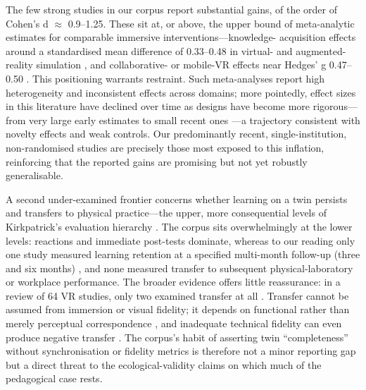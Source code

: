 The few strong studies in our corpus report substantial gains, of the order of
Cohen's d \ensuremath{\approx} 0.9--1.25. These sit at, or above, the upper bound of
meta-analytic estimates for comparable immersive interventions---knowledge-
acquisition effects around a standardised mean difference of 0.33--0.48 in
virtual- and augmented-reality simulation \cite{li_effects_2026,almekkawi_effectiveness_2026}, and collaborative- or mobile-VR effects near Hedges'
g 0.47--0.50 \cite{chen_effects_2026,widowati_meta-analysis_2025}. This positioning warrants
restraint. Such meta-analyses report high heterogeneity and inconsistent effects
across domains; more pointedly, effect sizes in this literature have declined
over time as designs have become
more rigorous---from very large early estimates to small recent ones
\cite{widowati_meta-analysis_2025}---a trajectory consistent with novelty effects and weak
controls. Our predominantly recent, single-institution, non-randomised studies
are precisely those most exposed to this inflation, reinforcing that the reported
gains are promising but not yet robustly generalisable.

A second under-examined frontier concerns whether learning on a twin persists and
transfers to physical practice---the upper, more consequential levels of
Kirkpatrick's evaluation hierarchy \cite{kirkpatrick_kirkpatricks_2016}. The corpus
sits overwhelmingly at the lower levels: reactions and immediate post-tests
dominate, whereas to our reading only one study measured learning retention at a
specified multi-month follow-up (three and six months) \cite{lin_visfactory_2025}, and
none measured transfer to subsequent physical-laboratory or workplace performance.
The broader evidence offers little reassurance: in a review of 64 VR studies, only
two examined transfer at all \cite{zhong_virtual_2026}. Transfer cannot be assumed from immersion or visual
fidelity; it depends on functional rather than merely perceptual correspondence
\cite{harris_framework_2020}, and inadequate technical fidelity can even produce
negative transfer \cite{kim_effect_2026}. The corpus's habit of asserting twin
``completeness'' without synchronisation or fidelity metrics is therefore not a
minor reporting gap but a direct threat to the ecological-validity claims on which
much of the pedagogical case rests.

